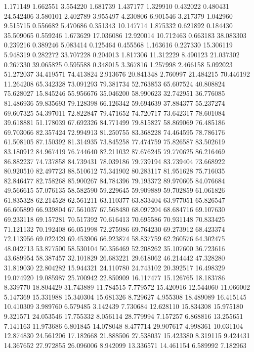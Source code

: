1.171149
1.662551
3.554220
1.681739
1.437177
1.329910
0.432022
0.480431
24.542406
3.580101
2.402789
3.955497
4.230806
6.901546
3.217379
1.042960
9.515715
0.556682
5.470686
0.351343
10.147714
1.875332
0.621892
0.184430
35.509065
0.559246
1.673629
17.036086
12.920014
10.712463
0.663183
38.083303
0.239216
0.389246
5.083414
0.125464
0.455568
1.163616
0.227330
15.306119
5.948319
0.282272
33.707228
0.204013
1.817306
11.312229
8.490123
21.037302
0.267330
39.065825
0.595588
0.348015
3.367816
1.257998
2.466158
5.092023
51.272037
34.419571
74.413824
2.913676
20.841348
2.760997
21.484215
70.446192
11.264208
65.342328
73.091293
79.381734
52.763853
65.607524
40.808824
75.628027
15.845246
55.956676
35.046200
58.990623
32.742951
36.776085
81.486936
59.835693
79.128398
66.126342
59.694639
37.884377
55.237274
69.607325
54.397011
72.822847
79.471652
74.720717
73.642317
78.601084
39.618881
51.178039
67.692326
84.771499
79.815827
58.869069
76.485186
69.703066
82.357424
72.994913
81.250755
83.368228
74.464595
78.786176
61.508105
87.150392
81.314935
73.845258
77.474759
75.826587
83.502619
83.180912
84.967419
76.744640
82.211032
87.676245
79.770625
86.216469
86.882237
74.737858
84.739431
78.039186
79.739194
83.739404
73.668922
80.920510
82.497723
88.510612
75.341902
80.283117
81.951628
75.716035
82.846477
82.758268
85.900267
84.784396
79.193372
89.970605
84.076684
49.566615
57.076135
58.582590
59.229645
59.909889
59.702859
61.061826
61.835328
62.214528
62.561211
63.110377
63.833404
63.977051
65.826547
66.605899
66.939804
67.561037
67.568480
68.097204
68.684716
69.107630
69.233118
69.157281
70.517392
70.616413
70.695586
70.931148
70.833425
71.121132
70.192408
66.051998
72.275986
69.764230
69.273912
68.423374
72.113956
69.022429
69.453906
66.923874
58.837759
62.260576
64.302475
48.042713
53.877500
58.530104
50.356469
52.208262
35.107600
36.723616
43.689954
58.387457
32.101829
26.683221
29.618062
46.214442
47.328280
31.819030
22.804282
15.944321
24.110780
24.743102
20.392517
16.498329
19.074920
19.085987
25.700942
22.850909
16.117477
15.126765
18.183786
8.339770
18.804429
31.743889
11.784515
7.779572
15.420916
12.544060
11.066002
5.147369
15.331988
15.340304
15.681326
8.729627
4.955308
18.489089
16.415145
10.410309
3.989760
6.579485
3.142439
7.730684
12.628110
15.834308
15.975180
9.321571
24.053546
17.755332
8.056114
28.779994
7.157257
6.868816
13.255651
7.141163
11.973686
6.801845
14.078048
8.477714
29.907617
4.998361
10.031104
12.874830
24.561206
17.182668
21.888506
27.538037
15.423380
8.319115
9.424431
14.367652
27.972855
26.096006
8.942099
13.336571
14.461154
6.589992
7.182963
